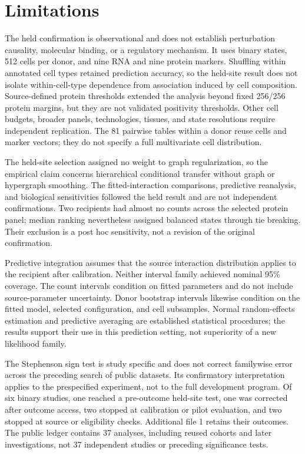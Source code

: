 \documentclass[pdflatex,sn-vancouver-num,iicol]{sn-jnl}
\begin{document}
\section{Limitations}

The held confirmation is observational and does not establish perturbation causality, molecular binding, or a regulatory mechanism. It uses binary states, 512 cells per donor, and nine RNA and nine protein markers. Shuffling within annotated cell types retained prediction accuracy, so the held-site result does not isolate within-cell-type dependence from association induced by cell composition. Source-defined protein thresholds extended the analysis beyond fixed 256/256 protein margins, but they are not validated positivity thresholds. Other cell budgets, broader panels, technologies, tissues, and state resolutions require independent replication. The 81 pairwise tables within a donor reuse cells and marker vectors; they do not specify a full multivariate cell distribution.

The held-site selection assigned no weight to graph regularization, so the empirical claim concerns hierarchical conditional transfer without graph or hypergraph smoothing. The fitted-interaction comparisons, predictive reanalysis, and biological sensitivities followed the held result and are not independent confirmations. Two recipients had almost no counts across the selected protein panel; median ranking nevertheless assigned balanced states through tie breaking. Their exclusion is a post hoc sensitivity, not a revision of the original confirmation.

Predictive integration assumes that the source interaction distribution applies to the recipient after calibration. Neither interval family achieved nominal 95\% coverage. The count intervals condition on fitted parameters and do not include source-parameter uncertainty. Donor bootstrap intervals likewise condition on the fitted model, selected configuration, and cell subsamples. Normal random-effects estimation and predictive averaging are established statistical procedures; the results support their use in this prediction setting, not superiority of a new likelihood family.

The Stephenson sign test is study specific and does not correct familywise error across the preceding search of public datasets. Its confirmatory interpretation applies to the prespecified experiment, not to the full development program. Of six binary studies, one reached a pre-outcome held-site test, one was corrected after outcome access, two stopped at calibration or pilot evaluation, and two stopped at source or eligibility checks. Additional file 1 retains their outcomes. The public ledger contains 37 analyses, including reused cohorts and later investigations, not 37 independent studies or preceding significance tests.
\end{document}
